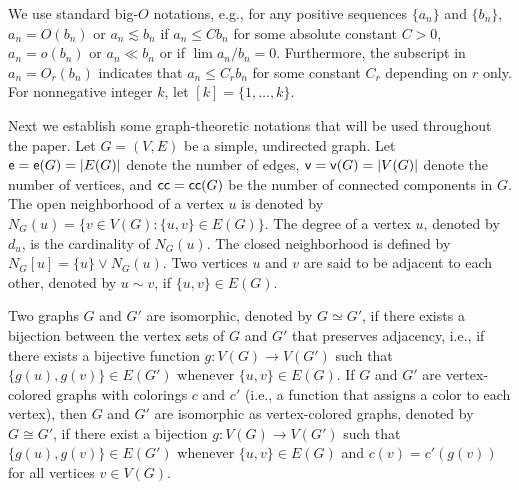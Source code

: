 We use standard big-$O$ notations,
e.g., for any positive sequences $\{a_n\}$ and $\{b_n\}$, $a_n=O(b_n)$ or $a_n \lesssim b_n$ if $a_n \leq C b_n$ for some absolute constant $C>0$,
$a_n=o(b_n)$ or $a_n \ll b_n$ or if $\lim a_n/b_n = 0$.
Furthermore, the subscript in $a_n=O_{r}(b_n)$ indicates that $a_n \leq C_r b_n$ for some constant $C_r$ depending on $r$ only. For nonnegative integer $ k $, let $ [k] = \{1, \dots, k \} $.

Next we establish some graph-theoretic notations that will be used throughout the paper. Let $ G = (V, E) $ be a simple, undirected graph. Let $ {\mathsf{e}} = {\mathsf{e}}(G) = |E(G)| $ denote the number of edges, $ {\mathsf{v}} = {\mathsf{v}}(G) = |V(G)| $ denote the number of vertices, and $ \mathsf{cc} = \mathsf{cc}(G) $ be the number of connected components in $G$. The open neighborhood of a vertex $ u $ is denoted by $ N_G(u) = \{ v \in V(G) : \{u, v\} \in E(G) \}  $. The degree of a vertex $ u $, denoted by $ d_u $, is the cardinality of $ N_G(u) $. The closed neighborhood is defined by $ N_G[u] = \{u\}\vee N_G(u) $. Two vertices $ u $ and $ v $ are said to be adjacent to each other, denoted by $ u \sim v $, if $ \{u, v\} \in E(G) $.

Two graphs $ G $ and $ G' $ are isomorphic, denoted by $ G \simeq G' $, if there exists a bijection between the vertex sets of $ G $ and $ G' $ that preserves adjacency, i.e., if there exists a bijective function $ g: V(G) \to V(G') $ such that $ \{g(u), g(v)\} \in E(G') $ whenever $ \{u, v\} \in E(G) $.
If $ G $ and $ G' $ are vertex-colored graphs with colorings $ c $ and $ c' $ (i.e., a function that assigns a color to each vertex), then $ G $ and $ G' $ are isomorphic as vertex-colored graphs, denoted by $ G \cong G' $, if there exist a bijection $ g: V(G) \to V(G') $ such that $ \{g(u), g(v)\} \in E(G') $ whenever $ \{u, v\} \in E(G) $ and $ c(v) = c'(g(v)) $ 
for all vertices $ v \in V(G) $.

